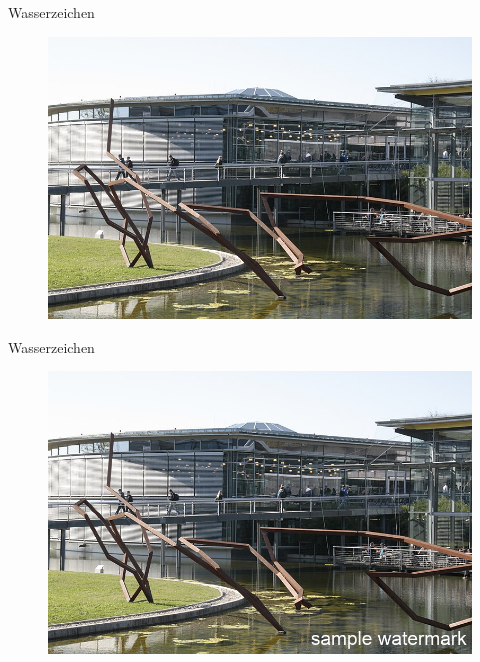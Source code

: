 \documentclass[a4paper,
	DIV=13,
	14pt,
	BCOR=10mm,
	department=FakEI,
	twoside,
	parskip=half,
	automark,
	aspectratio=169
]{beamer}
\begin{document}
\begin{frame}{Wasserzeichen}
	\begin{figure}[H]
		\includegraphics[height=0.8\textheight]{img/oth.jpg}
	\end{figure}
\end{frame}

\begin{frame}{Wasserzeichen}
	\begin{figure}[H]
		\includegraphics[height=0.8\textheight]{img/oth-wm.png}
	\end{figure}
\end{frame}
\end{document}
